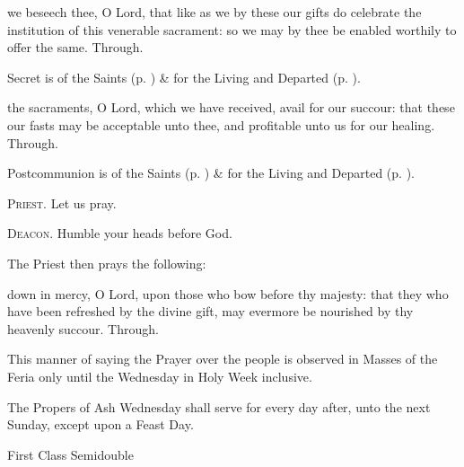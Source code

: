 \secret
{} we beseech thee, O Lord, that like as we by these our gifts do celebrate the institution of this venerable sacrament: so we may by thee be enabled worthily to offer the same. Through.
\begin{rubric}
     Secret is of the Saints (p. \pageref{SPSaints}) \&  for the Living and Departed (p. \pageref{SPLivingDeparted}).
\end{rubric}
\postcommunion
{} the sacraments, O Lord, which we have received, avail for our succour: that these our fasts may be acceptable unto thee, and profitable unto us for our healing. Through.
\begin{rubric}
     Postcommunion is of the Saints (p. \pageref{SPSaints}) \&  for the Living and Departed (p. \pageref{SPLivingDeparted}).
\end{rubric}

\textsc{Priest.} Let us pray.\par
\textsc{Deacon.} Humble your heads before God.\par
\begin{rubric}
    The Priest then prays the following:
\end{rubric}
 down in mercy, O Lord, upon those who bow before thy majesty: that they who have been refreshed by the divine gift, may evermore be nourished by thy heavenly succour. Through.
\begin{rubric}
This manner of saying the Prayer over the people is observed in Masses of the Feria only until the Wednesday in Holy Week inclusive.
\end{rubric}
\begin{rubric}
    The Propers of Ash Wednesday shall serve for every day after, unto the next Sunday, except upon a Feast Day.
\end{rubric}
\begin{inhead}
{First Class Semidouble}
\end{inhead}
\par\noindent
{}

